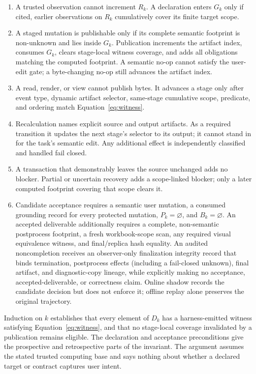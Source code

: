\begin{enumerate}
  \item A trusted observation cannot increment $R_k$. A declaration enters
  $G_k$ only if cited, earlier observations on $R_k$ cumulatively cover its
  finite target scope.
  \item A staged mutation is publishable only if its complete semantic footprint
  is non-unknown and lies inside $G_k$. Publication increments the artifact
  index, consumes $G_k$, clears stage-local witness coverage, and adds all
  obligations matching the computed footprint. A semantic no-op cannot satisfy
  the user-edit gate; a byte-changing no-op still advances the artifact index.
  \item A read, render, or view cannot publish bytes. It advances a stage only
  after event type, dynamic artifact selector, same-stage cumulative scope,
  predicate, and ordering match Equation~\ref{eq:witness}.
  \item Recalculation names explicit source and output artifacts. As a required
  transition it updates the next stage's selector to its output; it cannot stand
  in for the task's semantic edit. Any additional effect is independently
  classified and handled fail closed.
  \item A transaction that demonstrably leaves the source unchanged adds no
  blocker. Partial or uncertain recovery adds a scope-linked blocker; only a
  later computed footprint covering that scope clears it.
  \item Candidate acceptance requires a semantic user mutation, a consumed
  grounding record for every protected mutation, $P_k=\varnothing$, and
  $B_k=\varnothing$. An accepted deliverable additionally requires a complete,
  non-semantic postprocess footprint, a fresh workbook-scope scan, any required
  visual equivalence witness, and final/replica hash equality. An audited
  noncompletion receives an observer-only finalization integrity record that
  binds termination, postprocess effects (including a fail-closed unknown),
  final artifact, and diagnostic-copy lineage, while explicitly making no
  acceptance, accepted-deliverable, or correctness claim. Online shadow records the
  candidate decision but does not enforce it; offline replay alone preserves
  the original trajectory.
\end{enumerate}

Induction on $k$ establishes that every element of $D_k$ has a harness-emitted
witness satisfying Equation~\ref{eq:witness}, and that no stage-local coverage
invalidated by a publication remains eligible. The declaration and acceptance
preconditions give the prospective and retrospective parts of the invariant.
The argument assumes the stated trusted computing base and says nothing about
whether a declared target or contract captures user intent.

